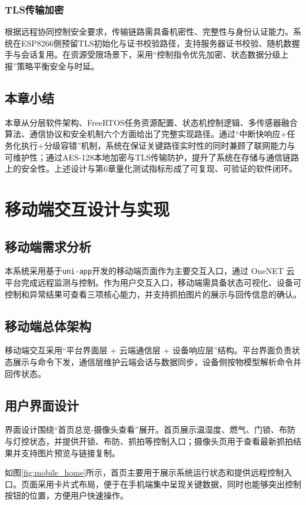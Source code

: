 \documentclass[UTF8,12pt,a4paper,oneside]{ctexbook}
\numberwithin{equation}{chapter}
\let\cite\supercite
\begin{document}
\subsection{TLS传输加密}
根据远程协同控制安全要求，传输链路需具备机密性、完整性与身份认证能力。系统在ESP8266侧预留TLS初始化与证书校验路径，支持服务器证书校验、随机数握手与会话复用\cite{rfc5246,tls_rfc}。在资源受限场景下，采用“控制指令优先加密、状态数据分级上报”策略平衡安全与时延。

\section{本章小结}
本章从分层软件架构、FreeRTOS任务资源配置、状态机控制逻辑、多传感器融合算法、通信协议和安全机制六个方面给出了完整实现路径。通过“中断快响应+任务化执行+分级容错”机制，系统在保证关键路径实时性的同时兼顾了联网能力与可维护性；通过AES-128本地加密与TLS传输防护，提升了系统在存储与通信链路上的安全性。上述设计与第6章量化测试指标形成了可复现、可验证的软件闭环。

\chapter{移动端交互设计与实现}
\section{移动端需求分析}
本系统采用基于\texttt{uni-app}开发的移动端页面作为主要交互入口，通过 OneNET 云平台完成远程监测与控制。作为用户交互入口，移动端需具备状态可视化、设备可控制和异常结果可查看三项核心能力，并支持抓拍图片的展示与回传信息的确认。
\section{移动端总体架构}
移动端交互采用“平台界面层 + 云端通信层 + 设备响应层”结构。平台界面负责状态展示与命令下发，通信层维护云端会话与数据同步，设备侧按物模型解析命令并回传状态\cite{mqtt_iot_review}。
\section{用户界面设计}
界面设计围绕“首页总览-摄像头查看”展开。首页展示温湿度、燃气、门锁、布防与灯控状态，并提供开锁、布防、抓拍等控制入口；摄像头页用于查看最新抓拍结果并支持图片预览与链接复制。

如图\ref{fig:mobile_home}所示，首页主要用于展示系统运行状态和提供远程控制入口。页面采用卡片式布局，便于在手机端集中呈现关键数据，同时也能够突出控制按钮的位置，方便用户快速操作。
\end{document}
